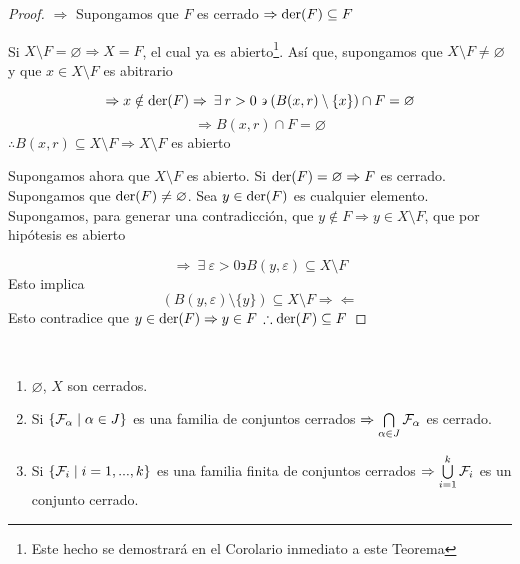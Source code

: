 \begin{proof}
    $\Rightarrow$ Supongamos que $F$ es cerrado $\Rightarrow \mathrm{der}(F) \subseteq F$

    Si $X \setminus F = \varnothing \Rightarrow X=F$, el cual ya es abierto\footnote{Este hecho se demostrará en el Corolario inmediato a este Teorema}. Así que, supongamos que $X \setminus F \neq \varnothing$ y que $x \in X \setminus F$ es abitrario

    \begin{equation*}
        \Rightarrow x \notin \mathrm{der}(F) \Rightarrow \: \exists \: r > 0 \backepsilon  (B(x,r) \setminus \{ x \}) \cap F = \varnothing
    \end{equation*}
    \begin{equation*}
        \Rightarrow B(x,r) \cap F = \varnothing
    \end{equation*}
    $\therefore B(x,r) \subseteq X \setminus F \Rightarrow X \setminus F$ es abierto

    Supongamos ahora que $X \setminus F$ es abierto. Si $\mathrm{der}(F) = \varnothing \Rightarrow F$ es cerrado. Supongamos que $\mathrm{der}(F) \neq \varnothing$. Sea $y \in \mathrm{der}(F)$ es cualquier elemento. Supongamos, para generar una contradicción, que $y \notin F \Rightarrow y \in X \setminus F$, que por hipótesis es abierto

    \begin{equation*}
        \Rightarrow \: \exists \: \varepsilon > 0 \backepsilon B(y, \varepsilon) \subseteq X \setminus F
    \end{equation*}
    Esto implica
    \begin{equation*}
        (B(y,\varepsilon) \setminus \{ y \} ) \subseteq X \setminus F \Rightarrow \Leftarrow
    \end{equation*}
    Esto contradice que $y \in \mathrm{der}(F) \Rightarrow y \in F$ $\therefore \mathrm{der}(F) \subseteq F$
\end{proof} 

\begin{corollary}
    \
    \begin{enumerate}
        \item $\varnothing$, $X$ son cerrados.
        \item Si $\{ {\mathcal{F}}_{\alpha} \mid \alpha \in J \}$ es una familia de conjuntos cerrados $\Rightarrow \bigcap\limits_{\alpha \in J} {\mathcal{F}}_{\alpha}$ es cerrado.
        \item Si $\{ {\mathcal{F}}_{i} \mid i=1,...,k \}$ es una familia finita de conjuntos cerrados $\Rightarrow \bigcup\limits_{i=1}^{k}{\mathcal{F}}_{i}$  es un conjunto cerrado. 
    \end{enumerate}
\end{corollary}

